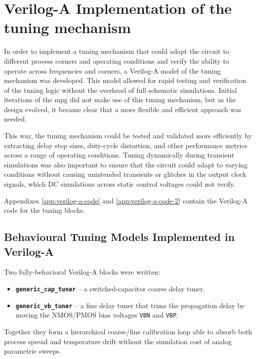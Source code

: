 \section{Verilog-A Implementation of the tuning mechanism}\label{sec:RTL_tuning}
In order to implement a tuning mechanism that could adapt the circuit to different process corners and operating conditions and verify the ability to operate across frequencies and corners, a Verilog-A model of the tuning mechanism was developed. This model allowed for rapid testing and verification of the tuning logic without the overhead of full schematic simulations. Initial iterations of the \gls{mpg} did not make use of this tuning mechanism, but as the design evolved, it became clear that a more flexible and efficient approach was needed.

This way, the tuning mechanism could be tested and validated more efficiently by extracting delay step sizes, duty‑cycle distortion, and other performance metrics across a range of operating conditions. Tuning dynamically during transient simulations was also important to ensure that the circuit could adapt to varying conditions without causing unintended transients or glitches in the output clock signals, which DC simulations across static control voltages could not verify.

Appendixes \ref{app:verilog-a-code} and \ref{app:verilog-a-code-2} contain the Verilog-A code for the tuning blocks.

\subsection{Behavioural Tuning Models Implemented in Verilog-A}
\label{sec:Verilog-A_tuners}

Two fully-behavioral Verilog-A blocks were written:

\begin{itemize}
  \item \textbf{\texttt{generic\_cap\_tuner}} – a switched-capacitor coarse delay tuner.
  \item \textbf{\texttt{generic\_vb\_tuner}} – a fine delay tuner that trims the propagation delay by moving the NMOS/PMOS bias voltages \texttt{VBN} and \texttt{VBP}.
\end{itemize}

Together they form a hierarchical coarse/fine calibration loop able to absorb both process spread and temperature drift without the simulation cost of analog parametric sweeps.

